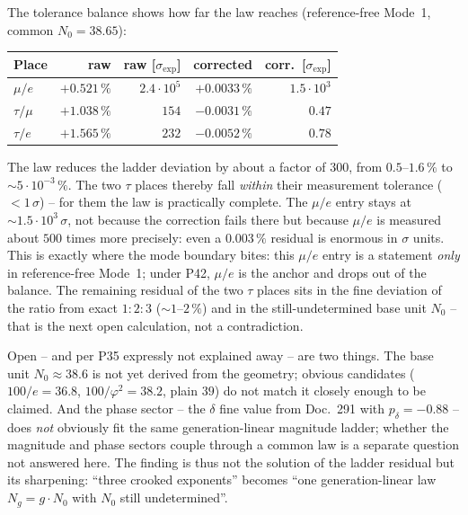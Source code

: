The tolerance balance shows how far the law reaches (reference-free Mode~1,
common $N_0=38.65$):
\begin{center}
\begin{tabular}{lrrrr}
\hline
Place & raw & raw [$\sigma_{\text{exp}}$] & corrected & corr.\ [$\sigma_{\text{exp}}$]\\
\hline
$\mu/e$    & $+0.521\,\%$ & $2.4\cdot10^{5}$ & $+0.0033\,\%$ & $1.5\cdot10^{3}$\\
$\tau/\mu$ & $+1.038\,\%$ & $154$            & $-0.0031\,\%$ & $0.47$\\
$\tau/e$   & $+1.565\,\%$ & $232$            & $-0.0052\,\%$ & $0.78$\\
\hline
\end{tabular}
\end{center}
The law reduces the ladder deviation by about a factor of $300$, from
$0.5$--$1.6\,\%$ to $\sim5\cdot10^{-3}\,\%$. The two $\tau$ places thereby
fall \emph{within} their measurement tolerance ($<1\,\sigma$) -- for them
the law is practically complete. The $\mu/e$ entry stays at
$\sim1.5\cdot10^{3}\,\sigma$, not because the correction fails there but
because $\mu/e$ is measured about $500$ times more precisely: even a
$0.003\,\%$ residual is enormous in $\sigma$ units. This is exactly where
the mode boundary bites: this $\mu/e$ entry is a statement \emph{only} in
reference-free Mode~1; under P42, $\mu/e$ is the anchor and drops out of the
balance. The remaining residual of the two $\tau$ places sits in the fine
deviation of the ratio from exact $1:2:3$ ($\sim1$--$2\,\%$) and in the
still-undetermined base unit $N_0$ -- that is the next open calculation, not
a contradiction.

Open -- and per P35 expressly not explained away -- are two things. The base
unit $N_0\approx38.6$ is not yet derived from the geometry; obvious
candidates ($100/e=36.8$, $100/\varphi^2=38.2$, plain $39$) do not match it
closely enough to be claimed. And the phase sector -- the $\delta$ fine
value from Doc.~291 with $p_\delta=-0.88$ -- does \emph{not} obviously fit
the same generation-linear magnitude ladder; whether the magnitude and
phase sectors couple through a common law is a separate question not
answered here. The finding is thus not the solution of the ladder residual
but its sharpening: \enquote{three crooked exponents} becomes \enquote{one
generation-linear law $N_g=g\cdot N_0$ with $N_0$ still undetermined}.

